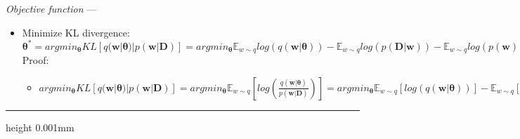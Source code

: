 \emph{Objective function} --- 
\begin{itemize}
    \item Minimize KL divergence: $\boldsymbol{\theta}^* = argmin_{\boldsymbol{\theta}} KL [ q(\boldsymbol{w}|\boldsymbol{\theta}) | p(\boldsymbol{w}|\boldsymbol{D}) ] = argmin_{\boldsymbol{\theta}} \mathbb{E}_{w \sim q} log (q(\boldsymbol{w}|\boldsymbol{\theta})) - \mathbb{E}_{w \sim q} log (p(\boldsymbol{D}|\boldsymbol{w})) - \mathbb{E}_{w \sim q} log (p(\boldsymbol{w}))$\\
    Proof:
    \begin{itemize}
        \item $argmin_{\boldsymbol{\theta}} KL [ q(\boldsymbol{w}|\boldsymbol{\theta}) | p(\boldsymbol{w}|\boldsymbol{D}) ] = argmin_{\boldsymbol{\theta}} \mathbb{E}_{w \sim q} [ log( \frac{q(\boldsymbol{w}|\boldsymbol{\theta})}{p(\boldsymbol{w}|\boldsymbol{D})} ) ] = argmin_{\boldsymbol{\theta}} \mathbb{E}_{w \sim q}[log( q(\boldsymbol{w}|\boldsymbol{\theta}) )] - \mathbb{E}_{w \sim q}[log( p(\boldsymbol{w}|\boldsymbol{D}) )] = argmin_{\boldsymbol{\theta}} \mathbb{E}_{w \sim q}[log( q(\boldsymbol{w}|\boldsymbol{\theta}) )] - \mathbb{E}_{w \sim q}[ \frac{p(\boldsymbol{D}|\boldsymbol{w}) \times p(\boldsymbol{w})}{ p(\boldsymbol{D}) } ] = argmin_{\boldsymbol{\theta}} \mathbb{E}_{w \sim q}log( q(\boldsymbol{w}|\boldsymbol{\theta}) ) - \mathbb{E}_{w \sim q} log (p(\boldsymbol{D}|\boldsymbol{w})) - \mathbb{E}_{w \sim q} log (p(\boldsymbol{w})) + \mathbb{E}_{w \sim q} log (p(\boldsymbol{D})) = argmin_{\boldsymbol{\theta}} \mathbb{E}_{w \sim q}log( q(\boldsymbol{w}|\boldsymbol{\theta}) ) - \mathbb{E}_{w \sim q} log (p(\boldsymbol{D}|\boldsymbol{w})) - \mathbb{E}_{w \sim q} log (p(\boldsymbol{w})) + \textrm{const.}$
    \end{itemize}
\end{itemize}

{\color{lightgray}\hrule height 0.001mm}


